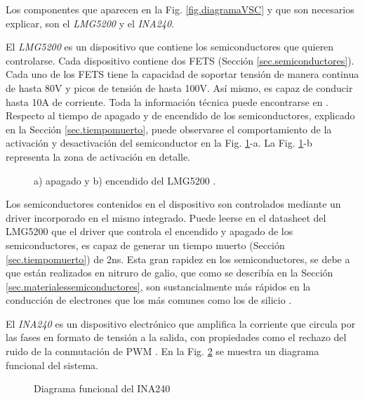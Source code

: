 \documentclass{report}
\begin{document}
Los componentes que aparecen en la Fig. \ref{fig.diagramaVSC} y que son necesarios explicar, son el \textit{LMG5200} y el \textit{INA240}.

El \textit{LMG5200} es un dispositivo que contiene los semiconductores que quieren controlarse. Cada dispositivo contiene dos FETS (Sección \ref{sec.semiconductores}). Cada uno de los FETS tiene la capacidad de soportar tensión de manera continua de hasta 80V y picos de tensión de hasta 100V. Así mismo, es capaz de conducir hasta 10A de corriente. Toda la información técnica puede encontrarse en \cite{cuarentayseis}. Respecto al tiempo de apagado y de encendido de los semiconductores, explicado en la Sección \ref{sec.tiempomuerto}, puede observarse el comportamiento de la activación y desactivación del semiconductor en la Fig. \ref{fig.detalledeadtimelmg5200}-a. La Fig. \ref{fig.detalledeadtimelmg5200}-b representa la zona de activación en detalle.

\begin{figure}[!h]
    \begin{center}
        \end{center}
        \caption{a) apagado y b) encendido del LMG5200 \cite{cuarentaynueve}.}
        \label{fig.detalledeadtimelmg5200}
\end{figure}


Los semiconductores contenidos en el dispositivo son controlados mediante un driver incorporado en el mismo integrado. Puede leerse en el datasheet del LMG5200 \cite{cuarentayseis} que el driver que controla el encendido y apagado de los semiconductores, es capaz de generar un tiempo muerto (Sección \ref{sec.tiempomuerto}) de 2ns. Esta gran rapidez en los semiconductores, se debe a que están realizados en nitruro de galio, que como se describía en la Sección \ref{sec.materialessemiconductores}, son sustancialmente más rápidos en la conducción de electrones que los más comunes como los de silicio \cite{siete}.

El \textit{INA240} es un dispositivo electrónico que amplifica la corriente que circula por las fases en formato de tensión a la salida, con propiedades como el rechazo del ruido de la conmutación de PWM \cite{cuarentaysiete}. En la Fig. \ref{fig.ina240diagrama} se muestra un diagrama funcional del sistema.

\begin{figure}[!h]
    \begin{center}
        \end{center}
        \caption{Diagrama funcional del INA240 \cite{cuarentayocho}}
        \label{fig.ina240diagrama}
\end{figure}
\end{document}
